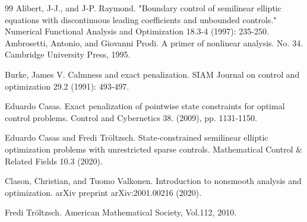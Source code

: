 \documentclass[11pt,a4paper]{amsart}
\begin{document}
\begin{thebibliography}{99}
Alibert, J-J., and J-P. Raymond. "Boundary control of semilinear elliptic equations with discontinuous leading coefficients and unbounded controls." Numerical Functional Analysis and Optimization 18.3-4 (1997): 235-250.
Ambrosetti, Antonio, and Giovanni Prodi. A primer of nonlinear analysis. No. 34. Cambridge University Press, 1995.

Burke, James V. Calmness and exact penalization. SIAM Journal on control and optimization 29.2 (1991): 493-497.

Eduardo Casas. Exact penalization of pointwise state constraints for optimal control problems. Control and Cybernetics 38. (2009), pp. 1131-1150.

Eduardo Casas and Fredi Tröltzsch. State-constrained semilinear elliptic optimization problems with unrestricted sparse controls. Mathematical Control \& Related Fields 10.3 (2020).

Clason, Christian, and Tuomo Valkonen. Introduction to nonsmooth analysis and optimization. arXiv preprint arXiv:2001.00216 (2020).

Fredi Tr\"oltzsch.
\newblock American Mathematical Society, Vol.112, 2010.

\end{thebibliography}
\end{document}
